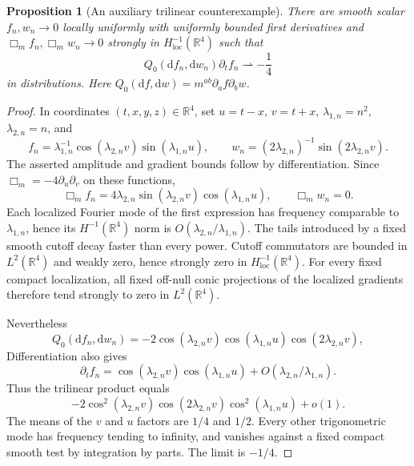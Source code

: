 \documentclass[11pt,a4paper]{article}
\numberwithin{equation}{section}
\newcommand{\loc}{\mathrm{loc}}
\newcommand{\dd}{\mathrm d}
\newcommand{\R}{\mathbb R}
\newcommand{\f}[2]{\frac{#1}{#2}}
\newtheorem{proposition}[theorem]{Proposition}
\theoremstyle{definition}
\begin{document}
\begin{proposition}[An auxiliary trilinear counterexample]\label{prop:cubic}
There are smooth scalar $f_n,w_n\to0$ locally uniformly with uniformly bounded first derivatives and $\Box_m f_n,\Box_mw_n\to0$ strongly in $H^{-1}_{\loc}(\R^4)$ such that
\begin{equation*}
Q_0(\dd f_n,\dd w_n)\partial_tf_n\rightharpoonup-\f14
\end{equation*}
in distributions. Here $Q_0(\dd f,\dd w)=m^{ab}\partial_af\partial_bw$.
\end{proposition}
\begin{proof}
In coordinates $(t,x,y,z)\in\R^4$, set $u=t-x$, $v=t+x$,
$\lambda_{1,n}=n^2$, $\lambda_{2,n}=n$, and
\begin{equation*}
f_n=\lambda_{1,n}^{-1}\cos(\lambda_{2,n}v)\sin(\lambda_{1,n}u),\qquad
w_n=(2\lambda_{2,n})^{-1}\sin(2\lambda_{2,n}v).
\end{equation*}
The asserted amplitude and gradient bounds follow by differentiation. Since $\Box_m=-4\partial_u\partial_v$ on these functions,
\begin{equation*}
\Box_mf_n=4\lambda_{2,n}\sin(\lambda_{2,n}v)\cos(\lambda_{1,n}u),\qquad \Box_mw_n=0.
\end{equation*}
Each localized Fourier mode of the first expression has frequency comparable to $\lambda_{1,n}$, hence its $H^{-1}(\R^4)$ norm is $O(\lambda_{2,n}/\lambda_{1,n})$. The tails introduced by a fixed smooth cutoff decay faster than every power. Cutoff commutators are bounded in $L^2(\R^4)$ and weakly zero, hence strongly zero in $H^{-1}_{\loc}(\R^4)$. For every fixed compact localization, all fixed off-null conic projections of the localized gradients therefore tend strongly to zero in $L^2(\R^4)$.

Nevertheless
\begin{equation*}
Q_0(\dd f_n,\dd w_n)=-2\cos(\lambda_{2,n}v)\cos(\lambda_{1,n}u)\cos(2\lambda_{2,n}v),
\end{equation*}
Differentiation also gives
\begin{equation*}
\partial_tf_n=\cos(\lambda_{2,n}v)\cos(\lambda_{1,n}u)
 +O(\lambda_{2,n}/\lambda_{1,n}).
\end{equation*}
Thus the trilinear product equals
\begin{equation*}
-2\cos^2(\lambda_{2,n}v)\cos(2\lambda_{2,n}v)\cos^2(\lambda_{1,n}u)+o(1).
\end{equation*}
The means of the $v$ and $u$ factors are $1/4$ and $1/2$. Every other trigonometric mode has frequency tending to infinity, and vanishes against a fixed compact smooth test by integration by parts. The limit is $-1/4$.
\end{proof}
\end{document}
